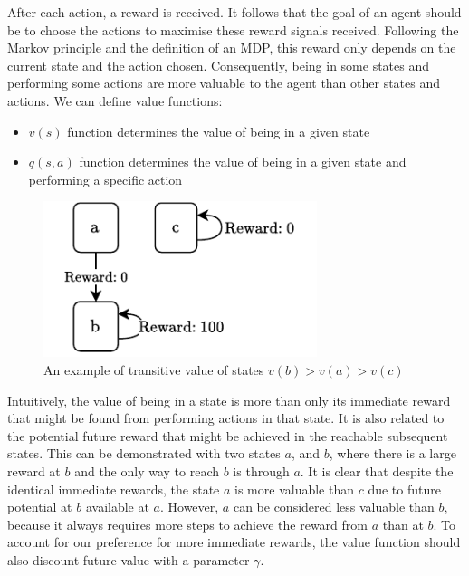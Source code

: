 \documentclass[]{final_report}
\begin{document}
After each action, a reward is received. It follows that the goal of an agent should be to choose the actions to maximise these reward signals received. Following the Markov principle and the definition of an MDP, this reward only depends on the current state and the action chosen. Consequently, being in some states and performing some actions are more valuable to the agent than other states and actions. We can define value functions: 
\begin{itemize}
  \item $v(s)$ function determines the value of being in a given state
  \item $q(s, a)$ function determines the value of being in a given state and performing a specific action
\end{itemize}



\begin{figure}[H]
  \centering
  
  \includegraphics[width=8cm]{reward-example-2}
  
  \caption{\label{fig:reward-example} An example of transitive value of states $v(b) > v(a) > v(c)$}
\end{figure}

Intuitively, the value of being in a state is more than only its immediate reward that might be found from performing actions in that state. It is also related to the potential future reward that might be achieved in the reachable subsequent states. This can be demonstrated with two states $a$, and $b$, where there is a large reward at $b$ and the only way to reach $b$ is through $a$. It is clear that despite the identical immediate rewards, the state $a$ is more valuable than $c$ due to future potential at $b$ available at $a$. However, $a$ can be considered less valuable than $b$, because it always requires more steps to achieve the reward from $a$ than at $b$. To account for our preference for more immediate rewards, the value function should also discount future value with a parameter $\gamma$. 
\end{document}
